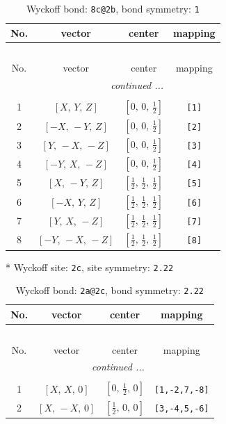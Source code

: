 \documentclass[fleqn,8pt]{jsarticle}
\begin{document}
\begin{longtable}{cccc}
\caption{Wyckoff bond: {\tt 8c@2b}, bond symmetry: {\tt 1}}
 \\
 \hline \hline
No. & vector & center & mapping \\ \hline \endfirsthead

\multicolumn{3}{l}{\tablename\ \thetable{}} \\
 \hline \hline
No. & vector & center & mapping \\ \hline \endhead

 \hline \hline
\multicolumn{3}{r}{\footnotesize\it continued ...} \\ \endfoot

 \hline \hline
\multicolumn{3}{r}{} \\ \endlastfoot

1 & $\left[ X,\, Y,\, Z \right]$ & $\left[ 0,\, 0,\, \frac{1}{2} \right]$ & {\tt [1]} \\ \hline
2 & $\left[ - X,\, - Y,\, Z \right]$ & $\left[ 0,\, 0,\, \frac{1}{2} \right]$ & {\tt [2]} \\ \hline
3 & $\left[ Y,\, - X,\, - Z \right]$ & $\left[ 0,\, 0,\, \frac{1}{2} \right]$ & {\tt [3]} \\ \hline
4 & $\left[ - Y,\, X,\, - Z \right]$ & $\left[ 0,\, 0,\, \frac{1}{2} \right]$ & {\tt [4]} \\ \hline
5 & $\left[ X,\, - Y,\, Z \right]$ & $\left[ \frac{1}{2},\, \frac{1}{2},\, \frac{1}{2} \right]$ & {\tt [5]} \\ \hline
6 & $\left[ - X,\, Y,\, Z \right]$ & $\left[ \frac{1}{2},\, \frac{1}{2},\, \frac{1}{2} \right]$ & {\tt [6]} \\ \hline
7 & $\left[ Y,\, X,\, - Z \right]$ & $\left[ \frac{1}{2},\, \frac{1}{2},\, \frac{1}{2} \right]$ & {\tt [7]} \\ \hline
8 & $\left[ - Y,\, - X,\, - Z \right]$ & $\left[ \frac{1}{2},\, \frac{1}{2},\, \frac{1}{2} \right]$ & {\tt [8]} \\
\end{longtable}
* Wyckoff site: {\tt 2c}, site symmetry: {\tt 2.22}
\renewcommand{\arraystretch}{1.2}
\begin{longtable}{cccc}
\caption{Wyckoff bond: {\tt 2a@2c}, bond symmetry: {\tt 2.22}}
 \\
 \hline \hline
No. & vector & center & mapping \\ \hline \endfirsthead

\multicolumn{3}{l}{\tablename\ \thetable{}} \\
 \hline \hline
No. & vector & center & mapping \\ \hline \endhead

 \hline \hline
\multicolumn{3}{r}{\footnotesize\it continued ...} \\ \endfoot

 \hline \hline
\multicolumn{3}{r}{} \\ \endlastfoot

1 & $\left[ X,\, X,\, 0 \right]$ & $\left[ 0,\, \frac{1}{2},\, 0 \right]$ & {\tt [1,-2,7,-8]} \\ \hline
2 & $\left[ X,\, - X,\, 0 \right]$ & $\left[ \frac{1}{2},\, 0,\, 0 \right]$ & {\tt [3,-4,5,-6]} \\
\end{longtable}
\end{document}
